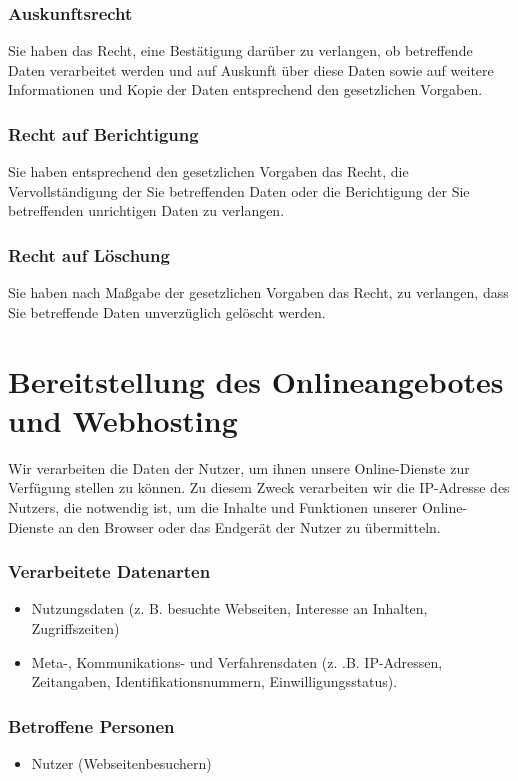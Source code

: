 \documentclass[12pt]{article}
\begin{document}
\section{Auskunftsrecht}
Sie haben das Recht, eine Bestätigung darüber zu verlangen, ob betreffende Daten verarbeitet werden und auf Auskunft über diese Daten sowie auf weitere Informationen und Kopie der Daten entsprechend den gesetzlichen Vorgaben.

\section{Recht auf Berichtigung}
Sie haben entsprechend den gesetzlichen Vorgaben das Recht, die Vervollständigung der Sie betreffenden Daten oder die Berichtigung der Sie betreffenden unrichtigen Daten zu verlangen.

\section{Recht auf Löschung}
Sie haben nach Maßgabe der gesetzlichen Vorgaben das Recht, zu verlangen, dass Sie betreffende Daten unverzüglich gelöscht werden.

\part{Bereitstellung des Onlineangebotes und Webhosting}
Wir verarbeiten die Daten der Nutzer, um ihnen unsere Online-Dienste zur Verfügung stellen zu können. Zu diesem Zweck verarbeiten wir die IP-Adresse des Nutzers, die notwendig ist, um die Inhalte und Funktionen unserer Online-Dienste an den Browser oder das Endgerät der Nutzer zu übermitteln.\\
\section{Verarbeitete Datenarten}
\begin{itemize}
\item Nutzungsdaten (z. B. besuchte Webseiten, Interesse an Inhalten, Zugriffszeiten)
\item Meta-, Kommunikations- und Verfahrensdaten (z. .B. IP-Adressen, Zeitangaben, Identifikationsnummern, Einwilligungsstatus).
\end{itemize}
\section{Betroffene Personen}
\begin{itemize}
\item Nutzer (Webseitenbesuchern)
\end{itemize}
\end{document}
